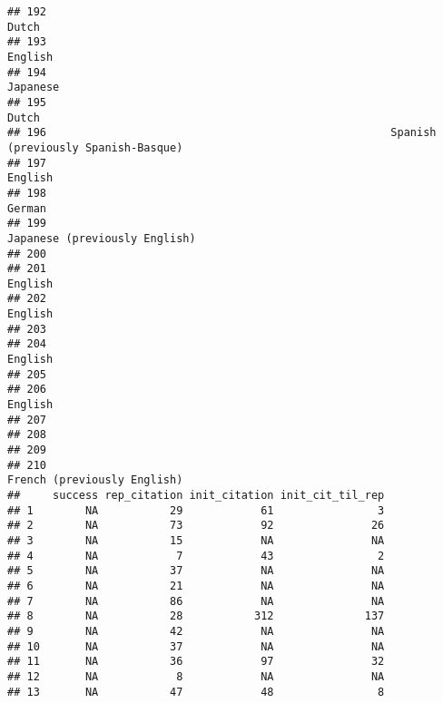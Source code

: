 \documentclass[
  english,
  man]{apa6}
\begin{document}
\begin{verbatim}
## 192                                                                                   Dutch
## 193                                                                                 English
## 194                                                                                Japanese
## 195                                                                                   Dutch
## 196                                                     Spanish (previously Spanish-Basque)
## 197                                                                                 English
## 198                                                                                  German
## 199                                                           Japanese (previously English)
## 200                                                                                        
## 201                                                                                 English
## 202                                                                                 English
## 203                                                                                        
## 204                                                                                 English
## 205                                                                                        
## 206                                                                                 English
## 207                                                                                        
## 208                                                                                        
## 209                                                                                        
## 210                                                             French (previously English)
##     success rep_citation init_citation init_cit_til_rep
## 1        NA           29            61                3
## 2        NA           73            92               26
## 3        NA           15            NA               NA
## 4        NA            7            43                2
## 5        NA           37            NA               NA
## 6        NA           21            NA               NA
## 7        NA           86            NA               NA
## 8        NA           28           312              137
## 9        NA           42            NA               NA
## 10       NA           37            NA               NA
## 11       NA           36            97               32
## 12       NA            8            NA               NA
## 13       NA           47            48                8

\end{verbatim}
\end{document}
